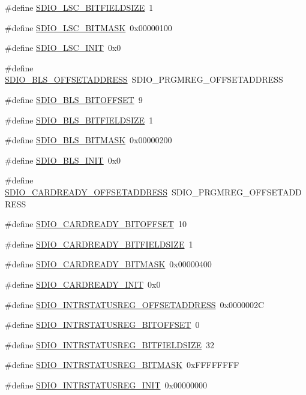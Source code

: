 \begin{DoxyCompactItemize}
\item 
\#define \hyperlink{a00571_a54c15b2b76de1d922f77cdc2d3042661}{SDIO\_\-LSC\_\-BITFIELDSIZE}~1
\item 
\#define \hyperlink{a00571_a9326a63fdbd8e0a75e4de4e0194da03f}{SDIO\_\-LSC\_\-BITMASK}~0x00000100
\item 
\#define \hyperlink{a00571_aa337c67176b8b54e70dfa94680a852fe}{SDIO\_\-LSC\_\-INIT}~0x0
\item 
\#define \hyperlink{a00571_ab96da3bb7a07bdd265461fc06507bb66}{SDIO\_\-BLS\_\-OFFSETADDRESS}~SDIO\_\-PRGMREG\_\-OFFSETADDRESS
\item 
\#define \hyperlink{a00571_a3fd88a62f2240b4af92c16e06f47dfb7}{SDIO\_\-BLS\_\-BITOFFSET}~9
\item 
\#define \hyperlink{a00571_ab5a027b9fb7cf7e144b9624f0b39a8da}{SDIO\_\-BLS\_\-BITFIELDSIZE}~1
\item 
\#define \hyperlink{a00571_af4131734997d08ece58efe4bf6e978d1}{SDIO\_\-BLS\_\-BITMASK}~0x00000200
\item 
\#define \hyperlink{a00571_a561d8fe61d85d91a41e7765dbbc716b8}{SDIO\_\-BLS\_\-INIT}~0x0
\item 
\#define \hyperlink{a00571_a7085255a34d5a87acc93c55669b23362}{SDIO\_\-CARDREADY\_\-OFFSETADDRESS}~SDIO\_\-PRGMREG\_\-OFFSETADDRESS
\item 
\#define \hyperlink{a00571_a1e4fe5b932e04906f08a44f11de35274}{SDIO\_\-CARDREADY\_\-BITOFFSET}~10
\item 
\#define \hyperlink{a00571_aae3e9f86daee85c3e5d5129410b5fe9f}{SDIO\_\-CARDREADY\_\-BITFIELDSIZE}~1
\item 
\#define \hyperlink{a00571_aa01ee624972ec55212ce57ee0b569e68}{SDIO\_\-CARDREADY\_\-BITMASK}~0x00000400
\item 
\#define \hyperlink{a00571_a8ff26acd528904024ee250400b24c391}{SDIO\_\-CARDREADY\_\-INIT}~0x0
\item 
\#define \hyperlink{a00571_a3f56933c283a37b6593bffad7d8d959e}{SDIO\_\-INTRSTATUSREG\_\-OFFSETADDRESS}~0x0000002C
\item 
\#define \hyperlink{a00571_a52a4fe8a282044c8ad32440e661486fd}{SDIO\_\-INTRSTATUSREG\_\-BITOFFSET}~0
\item 
\#define \hyperlink{a00571_a8050ab72f99815b622e071a076948f4b}{SDIO\_\-INTRSTATUSREG\_\-BITFIELDSIZE}~32
\item 
\#define \hyperlink{a00571_ab4b0cd2932c0355f1819d56d479676af}{SDIO\_\-INTRSTATUSREG\_\-BITMASK}~0xFFFFFFFF
\item 
\#define \hyperlink{a00571_a884e5931968a9b045854156ed74c00d6}{SDIO\_\-INTRSTATUSREG\_\-INIT}~0x00000000

\end{DoxyCompactItemize}
